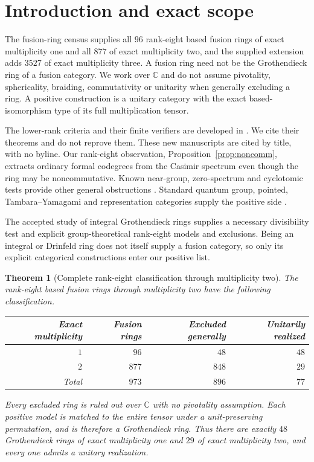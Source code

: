 \documentclass[11pt,reqno]{amsart}
\newtheorem{theorem}{Theorem}[section]
\theoremstyle{definition}
\theoremstyle{remark}
\newcommand{\C}{\mathbb C}
\begin{document}
\section{Introduction and exact scope}
The fusion-ring census \cite{Census} supplies all $96$ rank-eight based fusion rings of exact multiplicity one and all $877$ of exact multiplicity two, and the supplied extension adds $3527$ of exact multiplicity three. A fusion ring need not be the Grothendieck ring of a fusion category. We work over $\C$ and do not assume pivotality, sphericality, braiding, commutativity or unitarity when generally excluding a ring. A positive construction is a unitary category with the exact based-isomorphism type of its full multiplication tensor.

The lower-rank criteria and their finite verifiers are developed in \cite{R2,R3,R4,R5,R6,R7}. We cite their theorems and do not reprove them. These new manuscripts are cited by title, with no byline. Our rank-eight observation, Proposition~\ref{prop:noncomm}, extracts ordinary formal codegrees from the Casimir spectrum even though the ring may be noncommutative. Known near-group, zero-spectrum and cyclotomic tests provide other general obstructions \cite{SchNear,LPR,ENO}. Standard quantum group, pointed, Tambara--Yamagami and representation categories supply the positive side \cite{KO,TY,EGNO,Serre}.

The accepted study of integral Grothendieck rings \cite{Integral,IntegralAppendix} supplies a necessary divisibility test and explicit group-theoretical rank-eight models and exclusions. Being an integral or Drinfeld ring does not itself supply a fusion category, so only its explicit categorical constructions enter our positive list.

\begin{theorem}[Complete rank-eight classification through multiplicity two]\label{thm:main}
The rank-eight based fusion rings through multiplicity two have the following classification.
\begin{center}
\begin{tabular}{@{}rrrr@{}}\toprule
Exact multiplicity & Fusion rings & Excluded generally & Unitarily realized\\\midrule
$1$ & $96$ & $48$ & $48$\\
$2$ & $877$ & $848$ & $29$\\\midrule
Total & $973$ & $896$ & $77$\\\bottomrule
\end{tabular}
\end{center}
Every excluded ring is ruled out over $\C$ with no pivotality assumption. Each positive model is matched to the entire tensor under a unit-preserving permutation, and is therefore a Grothendieck ring. Thus there are exactly $48$ Grothendieck rings of exact multiplicity one and $29$ of exact multiplicity two, and every one admits a unitary realization.
\end{theorem}
\end{document}
